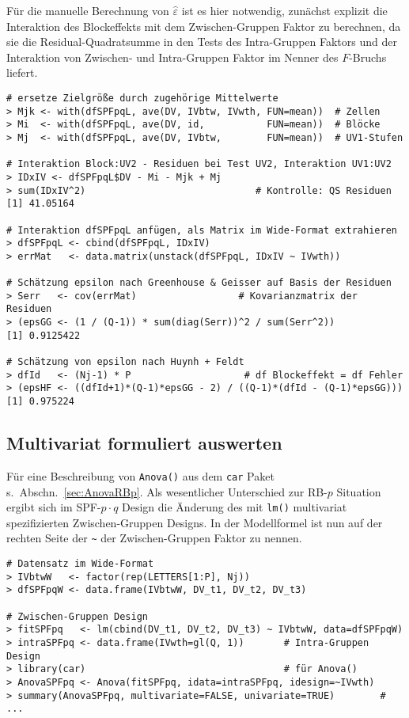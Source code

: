 Für die manuelle Berechnung von $\hat{\varepsilon}$ ist es hier notwendig, zunächst explizit die Interaktion des Blockeffekts mit dem Zwischen-Gruppen Faktor zu berechnen, da sie die Residual-Quadratsumme in den Tests des Intra-Gruppen Faktors und der Interaktion von Zwischen- und Intra-Gruppen Faktor im Nenner des $F$-Bruchs liefert.
\begin{lstlisting}
# ersetze Zielgröße durch zugehörige Mittelwerte
> Mjk <- with(dfSPFpqL, ave(DV, IVbtw, IVwth, FUN=mean))  # Zellen
> Mi  <- with(dfSPFpqL, ave(DV, id,           FUN=mean))  # Blöcke
> Mj  <- with(dfSPFpqL, ave(DV, IVbtw,        FUN=mean))  # UV1-Stufen

# Interaktion Block:UV2 - Residuen bei Test UV2, Interaktion UV1:UV2
> IDxIV <- dfSPFpqL$DV - Mi - Mjk + Mj
> sum(IDxIV^2)                              # Kontrolle: QS Residuen
[1] 41.05164

# Interaktion dfSPFpqL anfügen, als Matrix im Wide-Format extrahieren
> dfSPFpqL <- cbind(dfSPFpqL, IDxIV)
> errMat   <- data.matrix(unstack(dfSPFpqL, IDxIV ~ IVwth))

# Schätzung epsilon nach Greenhouse & Geisser auf Basis der Residuen
> Serr   <- cov(errMat)                  # Kovarianzmatrix der Residuen
> (epsGG <- (1 / (Q-1)) * sum(diag(Serr))^2 / sum(Serr^2))
[1] 0.9125422

# Schätzung von epsilon nach Huynh + Feldt
> dfId   <- (Nj-1) * P                    # df Blockeffekt = df Fehler
> (epsHF <- ((dfId+1)*(Q-1)*epsGG - 2) / ((Q-1)*(dfId - (Q-1)*epsGG)))
[1] 0.975224
\end{lstlisting}

\subsection{Multivariat formuliert auswerten}
\label{sec:SPFpqMult}

Für eine Beschreibung von \lstinline!Anova()! aus dem \lstinline!car! Paket s.\ Abschn.\ \ref{sec:AnovaRBp}. Als wesentlicher Unterschied zur RB-$p$ Situation ergibt sich im SPF-$p \cdot q$ Design die Änderung des mit \lstinline!lm()! multivariat spezifizierten Zwischen-Gruppen Designs. In der Modellformel ist nun auf der rechten Seite der \lstinline!~! der Zwischen-Gruppen Faktor zu nennen.
\begin{lstlisting}
# Datensatz im Wide-Format
> IVbtwW   <- factor(rep(LETTERS[1:P], Nj))
> dfSPFpqW <- data.frame(IVbtwW, DV_t1, DV_t2, DV_t3)

# Zwischen-Gruppen Design
> fitSPFpq   <- lm(cbind(DV_t1, DV_t2, DV_t3) ~ IVbtwW, data=dfSPFpqW)
> intraSPFpq <- data.frame(IVwth=gl(Q, 1))       # Intra-Gruppen Design
> library(car)                                   # für Anova()
> AnovaSPFpq <- Anova(fitSPFpq, idata=intraSPFpq, idesign=~IVwth)
> summary(AnovaSPFpq, multivariate=FALSE, univariate=TRUE)        # ...
\end{lstlisting}

